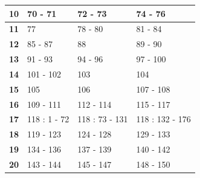 {\begin{table}[h]
\begin{tabular}{|cccc|}
  \multicolumn{1}{|c|}{\textbf{10}} & \multicolumn{1}{l|}{70 - 71} & \multicolumn{1}{l|}{72 - 73} & \multicolumn{1}{l|}{74 - 76} \\ \hline
  \multicolumn{1}{|c|}{\textbf{11}} & \multicolumn{1}{l|}{77} & \multicolumn{1}{l|}{78 - 80} & \multicolumn{1}{l|}{81 - 84} \\ \hline
  \multicolumn{1}{|c|}{\textbf{12}} & \multicolumn{1}{l|}{85 - 87} & \multicolumn{1}{l|}{88} & \multicolumn{1}{l|}{89 - 90} \\ \hline
  \multicolumn{1}{|c|}{\textbf{13}} & \multicolumn{1}{l|}{91 - 93} & \multicolumn{1}{l|}{94 - 96} & \multicolumn{1}{l|}{97 - 100} \\ \hline
  \multicolumn{1}{|c|}{\textbf{14}} & \multicolumn{1}{l|}{101 - 102} & \multicolumn{1}{l|}{103} & \multicolumn{1}{l|}{104} \\ \hline
  \multicolumn{1}{|c|}{\textbf{15}} & \multicolumn{1}{l|}{105} & \multicolumn{1}{l|}{106} & \multicolumn{1}{l|}{107 - 108} \\ \hline
  \multicolumn{1}{|c|}{\textbf{16}} & \multicolumn{1}{l|}{109 - 111} & \multicolumn{1}{l|}{112 - 114} & \multicolumn{1}{l|}{115 - 117} \\ \hline
  \multicolumn{1}{|c|}{\textbf{17}} & \multicolumn{1}{l|}{118 : 1 - 72} & \multicolumn{1}{l|}{118 : 73 - 131} & \multicolumn{1}{l|}{118 : 132 - 176} \\ \hline
  \multicolumn{1}{|c|}{\textbf{18}} & \multicolumn{1}{l|}{119 - 123} & \multicolumn{1}{l|}{124 - 128} & \multicolumn{1}{l|}{129 - 133} \\ \hline
  \multicolumn{1}{|c|}{\textbf{19}} & \multicolumn{1}{l|}{134 - 136} & \multicolumn{1}{l|}{137 - 139} & \multicolumn{1}{l|}{140 - 142} \\ \hline
  \multicolumn{1}{|c|}{\textbf{20}} & \multicolumn{1}{l|}{143 - 144} & \multicolumn{1}{l|}{145 - 147} & \multicolumn{1}{l|}{148 - 150} \\ \hline
  \end{tabular}
  \end{table}
}

\vfill\vfill

\newpage


\begin{center}
\end{center}

